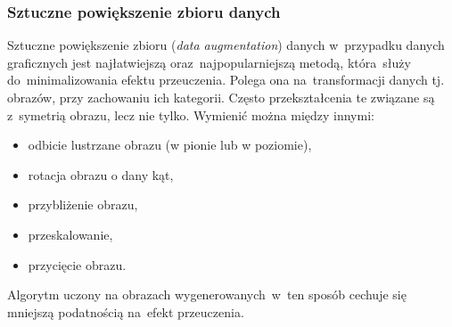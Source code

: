 \subsubsection{Sztuczne powiększenie zbioru danych}
Sztuczne powiększenie zbioru (\textit{data augmentation}) danych w~przypadku danych graficznych jest najłatwiejszą oraz~najpopularniejszą metodą, która~służy do~minimalizowania efektu przeuczenia\cite{dataaugment}. Polega ona na~transformacji danych tj. obrazów, przy zachowaniu ich kategorii. Często przekształcenia te związane są z~symetrią obrazu, lecz nie tylko. Wymienić można między innymi:
\begin{itemize}
\item odbicie lustrzane obrazu (w pionie lub w poziomie),
\item rotacja obrazu o dany kąt,
\item przybliżenie obrazu,
\item przeskalowanie,
\item przycięcie obrazu.
\end{itemize}
Algorytm uczony na obrazach wygenerowanych~w~ten sposób  cechuje się mniejszą podatnością na~efekt przeuczenia. 
